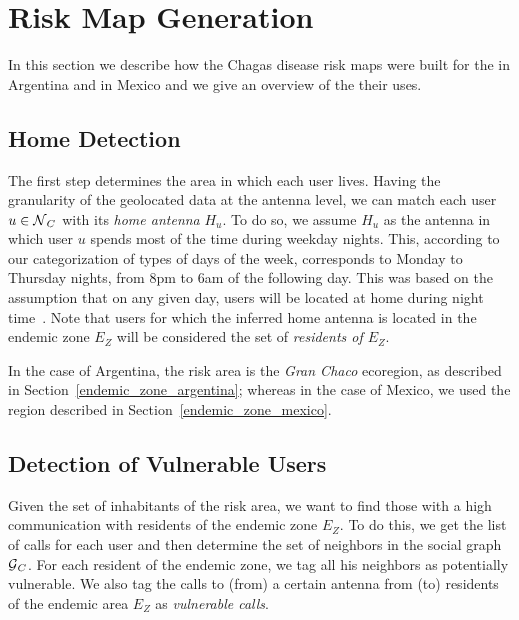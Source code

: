 



\section{ Risk Map Generation} \label{methods}

In this section we describe how the Chagas disease risk maps were built for the in Argentina and in Mexico and we give an overview of the their uses.

\subsection{Home Detection}

The first step determines the area in which each user lives. Having the granularity of the geolocated data at the antenna level, we can match each user $u \in \operatorname{\mathcal{N}}_C$ with its \textit{home antenna} $H_u$.  To do so, we assume $H_u$ as the antenna in which user $u$ spends most of the time during weekday nights. This, according to our categorization of types of days of the week, corresponds to Monday to Thursday nights, from 8pm to 6am of the following day. This was based on the assumption that on any given day, users will be located at home during night time~\cite{sarraute2015socialevents,csaji2012exploring}. 
Note that users for which the inferred home antenna is located in the endemic zone $E_Z$ will be considered the set of \textit{residents of $E_Z$}.

In the case of Argentina, the risk area is the \textit{Gran Chaco} ecoregion, as described in Section~\ref{endemic_zone_argentina};
whereas in the case of Mexico, we used the region described in Section~\ref{endemic_zone_mexico}.


\subsection{Detection of Vulnerable Users}

Given the set of inhabitants of the risk area, we want to find those with a high communication with residents of the endemic zone $E_Z$. To do this, we get the list of calls for each user and then determine the set of neighbors in the social graph $\operatorname{\mathcal{G}}_C$. For each resident of the endemic zone, we tag all his neighbors as potentially vulnerable. We also tag the calls to (from) a certain antenna from (to) residents of the endemic area $E_Z$ as \textit{vulnerable calls}.

